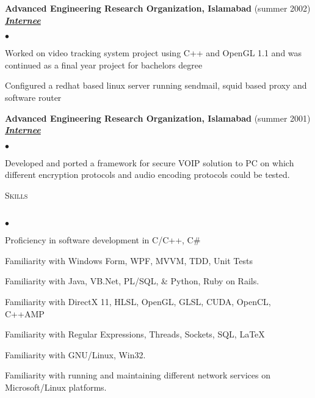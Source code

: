 \documentclass{article}
\newcommand{\lineunder}{\vspace*{-8pt} \\ \hspace*{-18pt} \hrulefill \\}
\newcommand{\header}[1]{{\hspace*{-15pt}\vspace*{6pt} \textsc{#1}} \vspace*{-6pt} \lineunder}
\newcommand{\employer}[3]{{ \textbf{#1} (#2)\\ \underline{\textbf{\emph{#3}}}\\  }}
\newenvironment{achievements}{\begin{list}{$\bullet$}{\topsep 0pt \itemsep -2pt}}{\vspace*{4pt}\end{list}}
\begin{document}
\employer{Advanced Engineering Research Organization, Islamabad}{summer 2002}{Internee}
	\begin{achievements}
	\item Worked on video tracking system project using C++ and OpenGL 1.1 and was continued as a final year project for bachelors degree
	\item Configured a redhat based linux server running sendmail, squid based proxy and software router
	\end{achievements}

\employer{Advanced Engineering Research Organization, Islamabad}{summer 2001}{Internee}
	\begin{achievements}
	\item Developed and ported a framework for secure VOIP solution to PC on which different encryption protocols and audio encoding protocols could be tested.
	\end{achievements}

\header{Skills}
\begin{achievements}
\item Proficiency in software development in C/C++, C\#
\item Familiarity with Windows Form, WPF, MVVM, TDD, Unit Tests
\item Familiarity with Java, VB.Net, PL/SQL, \& Python, Ruby on Rails.
\item Familiarity with DirectX 11, HLSL, OpenGL, GLSL, CUDA, OpenCL, C++AMP
\item Familiarity with Regular Expressions, Threads, Sockets, SQL, \LaTeX
\item Familiarity with GNU/Linux, Win32.
\item Familiarity with running and maintaining different network services on Microsoft/Linux platforms.
\end{achievements}
\end{document}
